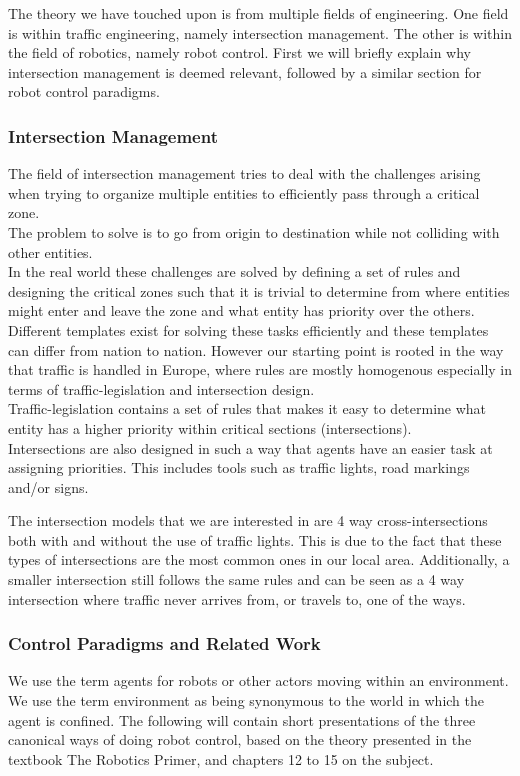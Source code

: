 The theory we have touched upon is from multiple fields of engineering. One field is within traffic engineering, namely intersection management. The other is within the field of robotics, namely robot control.
First we will briefly explain why intersection management is deemed relevant, followed by a similar section for robot control paradigms.

\subsubsection{Intersection Management}
The field of intersection management tries to deal with the challenges arising when trying to organize multiple entities to efficiently pass through a critical zone.\\
The problem to solve is to go from origin to destination while not colliding with other entities.\\
In the real world these challenges are solved by defining a set of rules and designing the critical zones such that it is trivial to determine from where entities might enter and leave the zone and what entity has priority over the others.\\ 

Different templates exist for solving these tasks efficiently and these templates can differ from nation to nation.
However our starting point is rooted in the way that traffic is handled in Europe, where rules are mostly homogenous especially in terms of traffic-legislation and intersection design.\\
Traffic-legislation contains a set of rules that makes it easy to determine what entity has a higher priority within critical sections (intersections).\\
Intersections are also designed in such a way that agents have an easier task at assigning priorities. 
This includes tools such as traffic lights, road markings and/or signs.

The intersection models that we are interested in are 4 way cross-intersections both with and without the use of traffic lights.
This is due to the fact that these types of intersections are the most common ones in our local area. Additionally, a smaller intersection still follows the same rules and can be seen as a 4 way intersection where traffic never arrives from, or travels to, one of the ways.

\subsubsection{Control Paradigms and Related Work}
We use the term agents for robots or other actors moving within an environment.\\
We use the term environment as being synonymous to the world in which the agent is confined.
The following will contain short presentations of the three canonical ways of doing robot control, based on the theory presented in the textbook The Robotics Primer\citep{book:mataric}, and chapters 12 to 15 on the subject.\\

